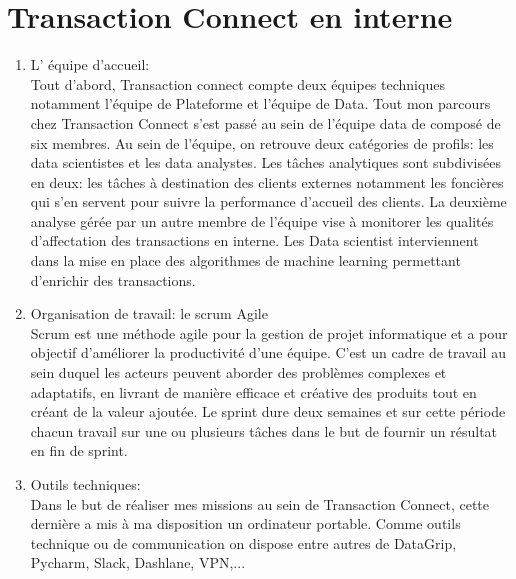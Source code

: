 \section{Transaction Connect en interne}
\begin{enumerate}
\item L’ équipe d’accueil:\\
Tout d’abord, Transaction connect compte deux équipes techniques notamment l’équipe de Plateforme et l’équipe de Data.
Tout mon parcours chez Transaction Connect s’est passé au sein de l’équipe data de composé de six membres. Au sein de l’équipe, on retrouve deux catégories de profils: les data scientistes et les data analystes. Les tâches analytiques sont subdivisées en deux: les tâches à destination des clients externes notamment les foncières qui s’en servent pour suivre la performance d’accueil des clients. La deuxième analyse gérée par un autre membre de l’équipe vise à monitorer les qualités d’affectation des transactions en interne. Les Data scientist interviennent dans la mise en place des algorithmes de machine learning permettant d’enrichir des transactions.

\item Organisation de travail: le scrum Agile\\
Scrum est une méthode agile pour la gestion de projet informatique et a pour objectif d’améliorer la productivité d’une équipe. C’est un cadre de travail au sein duquel les acteurs peuvent aborder des problèmes complexes et adaptatifs, en livrant de manière efficace et créative des produits tout en créant de la valeur ajoutée. Le sprint dure deux semaines et sur cette période chacun travail sur une ou plusieurs tâches dans le but de fournir un résultat en fin de sprint.

\item Outils techniques:\\
Dans le but de réaliser mes missions au sein de Transaction Connect, cette dernière a mis à ma disposition un ordinateur portable. Comme outils technique ou de communication on dispose entre autres de DataGrip, Pycharm, Slack, Dashlane, VPN,...
\end{enumerate}







